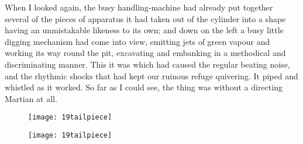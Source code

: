 When I looked again, the busy handling-machine had already put together several of the pieces of apparatus it had taken out of the cylinder into a shape having an unmistakable likeness to its own; and down on the left a busy little digging mechanism had come into view, emitting jets of green vapour and working its way round the pit, excavating and embanking in a methodical and discriminating manner. This it was which had caused the regular beating noise, and the rhythmic shocks that had kept our ruinous refuge quivering. It piped and whistled as it worked. So far as I could see, the thing was without a directing Martian at all.

\begin{a4}
	\begin{figure}[b!]
		\centering
		\texttt{[image: 19tailpiece]}
	\end{figure}
\end{a4}

\begin{letter}
	\begin{figure}[b!]
		\centering
		\texttt{[image: 19tailpiece]}
	\end{figure}
\end{letter}